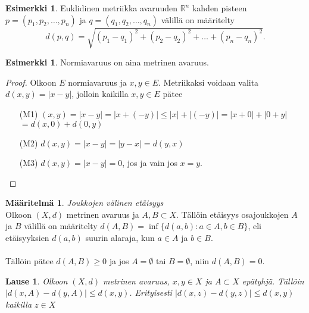 \documentclass[12pt,a4paper,leqno]{report}
\newcommand{\R}{\mathbb{R}}
\theoremstyle{plain}
\newtheorem{lause}[equation]{Lause}
\theoremstyle{definition}
\newtheorem{maar}[equation]{Määritelmä}
\newtheorem{esim}[equation]{Esimerkki}
\theoremstyle{remark}
\begin{document}
\begin{esim}
Euklidinen metriikka avaruuden $\R^n$ kahden pisteen $p=(p_1,p_2,\dots,p_n)$ ja $q=(q_1,q_2,\dots,q_n)$ välillä on määritelty 
$$d(p,q)=\sqrt{(p_1-q_1)^2+(p_2-q_2)^2+\dots+(p_n-q_n)^2}.$$
\end{esim}

\begin{esim}
Normiavaruus on aina metrinen avaruus. 

\begin{proof}
Olkoon $E$ normiavaruus ja $x,y\in E$. 
Metriikaksi voidaan valita $d(x,y)=|x-y|$, jolloin kaikilla $x,y\in E$ pätee
\begin{itemize}
\item[(M1)]%
$(x,y)=|x-y|=|x+(-y)|\leq|x|+|(-y)|=|x+0|+|0+y|$\\
$= d(x,0)+d(0,y)$
\item[(M2)]$d(x,y)=|x-y|=|y-x|=d(y,x)$
\item[(M3)]$d(x,y)=|x-y|=0$, jos ja vain jos $x=y$.
\end{itemize}
\end{proof}

\end{esim}
\begin{maar}\emph{Joukkojen välinen etäisyys}\\
Olkoon $(X,d)$ metrinen avaruus ja $A,B\subset X$. Tällöin etäisyys osajoukkojen $A$ ja $B$ välillä on määritelty $d(A,B)=\inf\{d(a,b)\colon a\in A, b\in B\}$, eli etäisyyksien $d(a,b)$ suurin alaraja, kun $a\in A$ ja $b\in B$. \\
\\
Tällöin pätee $d(A,B)\geq 0$ ja jos $A= \emptyset$ tai $B= \emptyset$, niin $d(A,B)= 0$. 

\end{maar}
\begin{lause}
Olkoon $(X,d)$ metrinen avaruus, $x,y\in X$ ja $A\subset X$ epätyhjä. Tällöin $|d(x,A)-d(y,A)|\leq d(x,y)$. Erityisesti $|d(x,z)-d(y,z)|\leq d(x,y)$ kaikilla $z\in X$
\end{lause}
\end{document}

